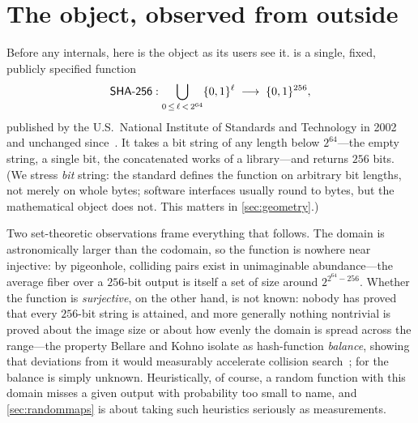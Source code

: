 \section{The object, observed from outside}\label{sec:history}

Before any internals, here is the object as its users see it. \SHA{} is a
single, fixed, publicly specified function
\[
  \textsf{SHA-256} : \bigcup_{0 \,\le\, \ell \,<\, 2^{64}} \{0,1\}^{\ell}
         \;\longrightarrow\; \{0,1\}^{256},
\]
published by the U.S.\ National Institute of Standards and Technology in
2002 and unchanged since~\citep{FIPS180-4}. It takes a bit string of any
length below $2^{64}$---the empty string, a single bit, the concatenated
works of a library---and returns $256$ bits. (We stress \emph{bit} string:
the standard defines the function on arbitrary bit lengths, not merely on
whole bytes; software interfaces usually round to bytes, but the
mathematical object does not. This matters in \cref{sec:geometry}.)

Two set-theoretic observations frame everything that follows. The domain
is astronomically larger than the codomain, so the function is nowhere
near injective: by pigeonhole, colliding pairs exist in unimaginable
abundance---the average fiber over a $256$-bit output is itself a set of
size around $2^{2^{64}-256}$. Whether the function is \emph{surjective},
on the other hand, is not known: nobody has proved that every $256$-bit
string is attained, and more generally nothing nontrivial is proved about
the image size or about how evenly the domain is spread across the
range---the property Bellare and Kohno isolate as hash-function
\emph{balance}, showing that deviations from it would measurably
accelerate collision search~\citep{BellareKohno2004}; for \SHA{} the
balance is simply unknown. Heuristically, of course, a random function
with this domain misses a given output with probability too small to
name, and \cref{sec:randommaps} is about taking such heuristics seriously
as measurements.

